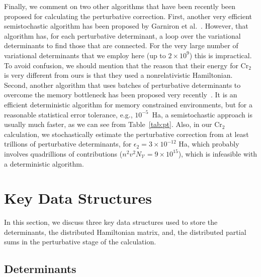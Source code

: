 \documentclass[%
reprint,
 superscriptaddress,
 amsmath,amssymb,
 aps,
]{revtex4-1}
\def\V{\mathcal{V}}
\begin{document}
Finally, we comment on two other algorithms that have been recently been proposed for calculating the perturbative correction.
First, another very efficient semistochastic algorithm has been proposed
by Garniron et al.~\cite{GarSceLooCaf-JCP-17}.  However, that algorithm has, for each perturbative determinant, a loop over the variational determinants to find those that are connected.  For the very large number of variational determinants that we employ
here (up to $2 \times 10^9$) this is impractical.
To avoid confusion, we should mention that the reason that their energy for Cr$_2$ is very different from ours is
that they used a nonrelativistic Hamiltonian.
Second, another algorithm that uses batches of perturbative determinants to overcome the memory bottleneck has been proposed
very recently~\cite{TubLevHaiHeaWha-ARX-18}.
It is an efficient deterministic algorithm for memory constrained environments,
but for a reasonable statistical error tolerance, e.g., $10^{-5}$~Ha,
a semistochastic approach is usually much faster, as we can see from Table~\ref{tab:pt}.
Also, in our Cr$_2$ calculation, we stochastically estimate the perturbative correction from at least trillions of perturbative determinants,
for $\epsilon_2=3\times10^{-12}$ Ha, which probably involves quadrillions of contributions
($n^2v^2N_\V = 9 \times 10^{15}$), which is infeasible with a deterministic algorithm.


\section{Key Data Structures}
\label{key}
In this section, we discuss three key data structures used to store the determinants, the distributed Hamiltonian matrix, and,
the distributed partial sums in the perturbative stage of the calculation.

\subsection{Determinants}
\label{{sec:det}}
%
%
\end{document}
